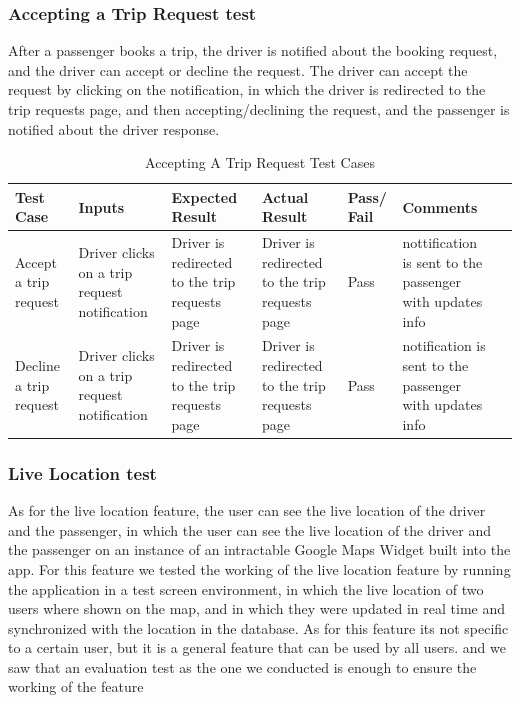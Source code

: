 \documentclass[a4paper, 12pt]{report} %
\begin{document}
            \subsubsection{Accepting a Trip Request test}
                After a passenger books a trip, the driver is notified about the booking request, and the driver can accept or decline the request. The driver can accept the request by clicking on the notification, in which the driver is redirected to the trip requests page, and then accepting/declining the request, and the passenger is notified about the driver response.

                \begin{spacing}{1}
                    \begin{table}[H]
                        \centering
                        \label{tab:login_test}
                        \begin{tabularx}{\linewidth}{| R{2cm}|R{3cm}|R{2cm}|R{2cm}|R{2cm}|R{2cm}|R{2cm}|}
                            \hline
                             \textbf{Test Case} & \textbf{Inputs} & \textbf{Expected Result} & \textbf{Actual Result} & \textbf{Pass/ Fail} & \textbf{Comments} \\
                            \hline
                            Accept a trip request & Driver clicks on a trip request notification & Driver is redirected to the trip requests page & Driver is redirected to the trip requests page & Pass & nottification is sent to the passenger with updates info\\
                            \hline
                            Decline a trip request & Driver clicks on a trip request notification & Driver is redirected to the trip requests page & Driver is redirected to the trip requests page & Pass & notification is sent to the passenger with updates info\\
                            \hline
                        \end{tabularx}
                        \caption{Accepting A Trip Request Test Cases}
                    \end{table}
                \end{spacing}

        \subsubsection{Live Location test}
            As for the live location feature, the user can see the live location of the driver and the passenger, in which the user can see the live location of the driver and the passenger on an instance of an intractable Google Maps Widget built into the app.
            For this feature we tested the working of the live location feature by running the application in a test screen environment, in which the live location of two users where shown on the map, and in which they were updated in real time and synchronized with the location in the database.
            As for this feature its not specific to a certain user, but it is a general feature that can be used by all users. and we saw that an evaluation test as the one we conducted is enough to ensure the working of the feature
\end{document}

